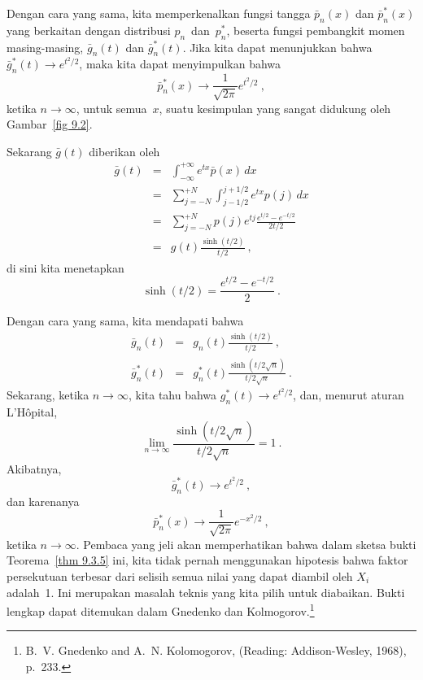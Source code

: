 Dengan cara yang sama, kita memperkenalkan fungsi tangga $\bar p_n(x)$ dan
$\bar p_n^*(x)$ yang berkaitan dengan distribusi $p_n$~dan~$p_n^*$, beserta
fungsi pembangkit momen masing-masing, $\bar g_n(t)$ dan $\bar g_n^*(t)$.  Jika kita
dapat menunjukkan bahwa $\bar g_n^*(t) \to e^{t^2/2}$, maka kita dapat menyimpulkan bahwa
$$
\bar p_n^*(x) \to \frac1{\sqrt{2\pi}} e^{t^2/2}\ ,
$$
ketika $n \rightarrow \infty$, untuk semua~$x$, suatu kesimpulan yang sangat didukung oleh 
Gambar~\ref{fig 9.2}.
\par
Sekarang $\bar g(t)$ diberikan oleh
\begin{eqnarray*}
\bar g(t) &=& \int_{-\infty}^{+\infty} e^{tx} \bar p(x)\, dx \\
               &=& \sum_{j = -N}^{+N} \int_{j - 1/2}^{j + 1/2} e^{tx} p(j)\, dx\\
               &=& \sum_{j = -N}^{+N} p(j) e^{tj} \frac{e^{t/2} - e^{-t/2}}
{2t/2} \\
               &=& g(t) \frac{\sinh(t/2)}{t/2}\ ,
\end{eqnarray*}
di sini kita menetapkan
$$
\sinh(t/2) = \frac{e^{t/2} - e^{-t/2}}2\ .
$$
\par
Dengan cara yang sama, kita mendapati bahwa
\begin{eqnarray*}
\bar g_n(t)   &=& g_n(t) \frac{\sinh(t/2)}{t/2}\ , \\
\bar g_n^*(t) &=& g_n^*(t) \frac{\sinh(t/2\sqrt n)}{t/2\sqrt n}\ .
\end{eqnarray*}
Sekarang, ketika $n \to \infty$, kita tahu bahwa $g_n^*(t) \to e^{t^2/2}$, dan, menurut
aturan L'H\^opital,
$$
\lim_{n \to \infty} \frac{\sinh(t/2\sqrt n)}{t/2\sqrt n} = 1\ .
$$
Akibatnya,
$$
\bar g_n^*(t) \to e^{t^2/2}\ ,
$$
dan karenanya
$$
\bar p_n^*(x) \to \frac1{\sqrt{2\pi}} e^{-x^2/2}\ ,
$$
ketika $n \rightarrow \infty$.
Pembaca yang jeli akan memperhatikan bahwa dalam sketsa bukti Teorema~\ref{thm 9.3.5} ini,
kita tidak pernah menggunakan hipotesis bahwa faktor persekutuan terbesar dari
selisih semua nilai yang dapat diambil oleh $X_i$ adalah~1.  Ini merupakan masalah
teknis yang kita pilih untuk diabaikan.  Bukti lengkap dapat ditemukan dalam Gnedenko dan
Kolmogorov.\footnote{B.~V. Gnedenko and A.~N. Kolomogorov,  (Reading: Addison-Wesley, 1968), p.~233.}

